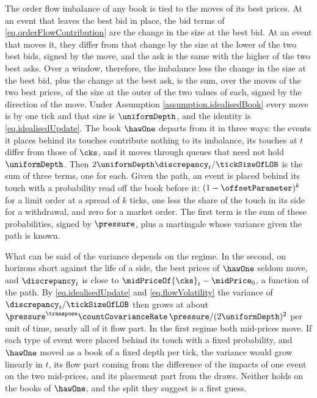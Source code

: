 The order flow imbalance of any book is tied to the moves of its best prices.
At an event that leaves the best bid in place,
the bid terms of \eqref{eq.orderFlowContribution} are the change in the size at the best bid.
At an event that moves it,
they differ from that change by the size at the lower of the two best bids,
signed by the move,
and the ask is the same with the higher of the two best asks.
Over a window, therefore,
the imbalance less the change in the size at the best bid,
plus the change at the best ask,
is the sum, over the moves of the two best prices,
of the size at the outer of the two values of each,
signed by the direction of the move.
Under Assumption \ref{assumption.idealisedBook}
every move is by one tick and that size is $\uniformDepth$,
and the identity is \eqref{eq.idealisedUpdate}.
The book $\hawOne$ departs from it in three ways:
the events it places behind its touches contribute nothing to its imbalance,
its touches at $t$ differ from those of $\cks$,
and it moves through queues that need not hold $\uniformDepth$.
Then $2\uniformDepth\discrepancy_t/\tickSizeOfLOB$ is the sum of three terms, one for each.
Given the path,
an event is placed behind its touch with a probability read off the book before it:
$(1-\offsetParameter)^{k}$ for a limit order at a spread of $k$ ticks,
one less the share of the touch in its side for a withdrawal,
and zero for a market order.
The first term is the sum of these probabilities, signed by $\pressure$,
plus a martingale whose variance given the path is known.

What can be said of the variance depends on the regime.
In the second,
on horizons short against the life of a side,
the best prices of $\hawOne$ seldom move,
and $\discrepancy_t$ is close to $\midPriceOf{\cks}_t - \midPrice_0$,
a function of the path.
By \eqref{eq.idealisedUpdate} and \eqref{eq.flowVolatility}
the variance of $\discrepancy_t/\tickSizeOfLOB$ then grows at about
$\pressure^{\transpose}\countCovarianceRate\,\pressure/(2\uniformDepth)^{2}$
per unit of time,
nearly all of it flow part.
In the first regime both mid-prices move.
If each type of event were placed behind its touch with a fixed probability,
and $\hawOne$ moved as a book of a fixed depth per tick,
the variance would grow linearly in $t$,
its flow part coming from the difference of the impacts of one event on the two mid-prices,
and its placement part from the draws.
Neither holds on the books of $\hawOne$,
and the split they suggest is a first guess.

